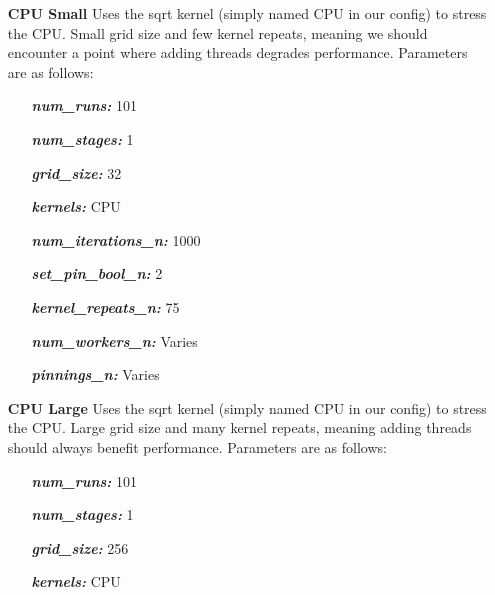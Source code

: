 \begin{itemize}
    \item[\textbf{CPU Small}] Uses the sqrt kernel (simply named CPU in our config) to stress the CPU. Small grid size and few kernel repeats, meaning we should encounter a point where adding threads degrades performance. Parameters are as follows:
    
    \begin{itemize}
        \item[\textit{\textbf{num\_runs:}}] 101
        
        \item[\textit{\textbf{num\_stages:}}] 1
        
        \item[\textit{\textbf{grid\_size:}}] 32
        
        \item[\textit{\textbf{kernels:}}] CPU
        
        \item[\textit{\textbf{num\_iterations\_n:}}] 1000
        
        \item[\textit{\textbf{set\_pin\_bool\_n:}}] 2
        
        \item[\textit{\textbf{kernel\_repeats\_n:}}] 75
        
        \item[\textit{\textbf{num\_workers\_n:}}] Varies
        
        \item[\textit{\textbf{pinnings\_n:}}] Varies
    \end{itemize}
    
    \item[\textbf{CPU Large}] Uses the sqrt kernel (simply named CPU in our config) to stress the CPU. Large grid size and many kernel repeats, meaning adding threads should always benefit performance. Parameters are as follows:
    
    \begin{itemize}
        \item[\textit{\textbf{num\_runs:}}] 101
        
        \item[\textit{\textbf{num\_stages:}}] 1
        
        \item[\textit{\textbf{grid\_size:}}] 256
        
        \item[\textit{\textbf{kernels:}}] CPU
        

\end{itemize}
\end{itemize}
